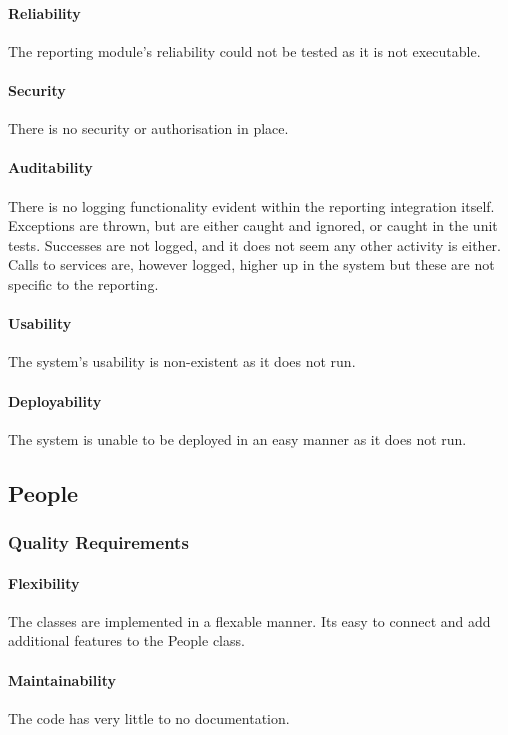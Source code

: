 \documentclass{article}
\begin{document}
        	\paragraph{Reliability}
            The reporting module's reliability could not be tested as it is not executable.
            \paragraph{Security}
            There is no security or authorisation in place.
            \paragraph{Auditability}
            There is no logging functionality evident within the reporting integration itself. Exceptions are thrown, but are either caught and ignored, or caught in the unit tests. Successes are not logged, and it does not seem any other activity is either. Calls to services are, however logged, higher up in the system but these are not specific to the reporting.
			\paragraph{Usability} The system's usability is non-existent as it does not run.
			\paragraph{Deployability} The system is unable to be deployed in an easy manner as it does not run.    

	\subsection{People}
    	\subsubsection{Quality Requirements}
    		\paragraph{Flexibility}
            The classes are implemented in a flexable manner. Its easy to connect and add additional features to the People class. 
    
            \paragraph{Maintainability}
            The code has very little to no documentation.
            
\end{document}
